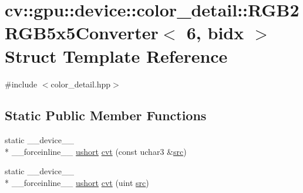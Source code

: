 \hypertarget{structcv_1_1gpu_1_1device_1_1color__detail_1_1RGB2RGB5x5Converter_3_016_00_01bidx_01_4}{\section{cv\-:\-:gpu\-:\-:device\-:\-:color\-\_\-detail\-:\-:R\-G\-B2\-R\-G\-B5x5\-Converter$<$ 6, bidx $>$ Struct Template Reference}
\label{structcv_1_1gpu_1_1device_1_1color__detail_1_1RGB2RGB5x5Converter_3_016_00_01bidx_01_4}
}


{\ttfamily \#include $<$color\-\_\-detail.\-hpp$>$}

\subsection*{Static Public Member Functions}
\begin{DoxyCompactItemize}
\item 
static \-\_\-\-\_\-device\-\_\-\-\_\- \\*
\-\_\-\-\_\-forceinline\-\_\-\-\_\- \hyperlink{core_2types__c_8h_ab95f123a6c9bcfee6a343170ef8c5f69}{ushort} \hyperlink{structcv_1_1gpu_1_1device_1_1color__detail_1_1RGB2RGB5x5Converter_3_016_00_01bidx_01_4_a299da32f39b1b2e87c646daee441efad}{cvt} (const uchar3 \&\hyperlink{legacy_8hpp_a371cd109b74033bc4366f584edd3dacc}{src})
\item 
static \-\_\-\-\_\-device\-\_\-\-\_\- \\*
\-\_\-\-\_\-forceinline\-\_\-\-\_\- \hyperlink{core_2types__c_8h_ab95f123a6c9bcfee6a343170ef8c5f69}{ushort} \hyperlink{structcv_1_1gpu_1_1device_1_1color__detail_1_1RGB2RGB5x5Converter_3_016_00_01bidx_01_4_a8aa91bf158f1009481e24323a223a488}{cvt} (uint \hyperlink{legacy_8hpp_a371cd109b74033bc4366f584edd3dacc}{src})
\end{DoxyCompactItemize}


